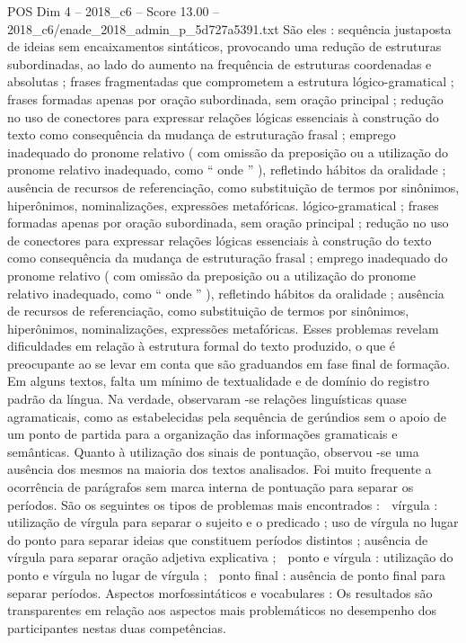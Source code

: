\begin{textsample}{POS Dim 4 – 2018\_c6 – Score 13.00 – 2018\_c6/enade\_2018\_admin\_p\_5d727a5391.txt}
São eles : sequência justaposta de ideias sem encaixamentos sintáticos, provocando uma redução de estruturas subordinadas, ao lado do aumento na frequência de estruturas coordenadas e absolutas ; frases fragmentadas que comprometem a estrutura lógico-gramatical ; frases formadas apenas por oração subordinada, sem oração principal ; redução no uso de conectores para expressar relações lógicas essenciais à construção do texto como consequência da mudança de estruturação frasal ; emprego inadequado do pronome relativo ( com omissão da preposição ou a utilização do pronome relativo inadequado, como “ onde ” ), refletindo hábitos da oralidade ; ausência de recursos de referenciação, como substituição de termos por sinônimos, hiperônimos, nominalizações, expressões metafóricas. lógico-gramatical ; frases formadas apenas por oração subordinada, sem oração principal ; redução no uso de conectores para expressar relações lógicas essenciais à construção do texto como consequência da mudança de estruturação frasal ; emprego inadequado do pronome relativo ( com omissão da preposição ou a utilização do pronome relativo inadequado, como “ onde ” ), refletindo hábitos da oralidade ; ausência de recursos de referenciação, como substituição de termos por sinônimos, hiperônimos, nominalizações, expressões metafóricas.
Esses problemas revelam dificuldades em relação à estrutura formal do texto produzido, o que é preocupante ao se levar em conta que são graduandos em fase final de formação.
Em alguns textos, falta um mínimo de textualidade e de domínio do registro padrão da língua.
Na verdade, observaram -se relações linguísticas quase agramaticais, como as estabelecidas pela sequência de gerúndios sem o apoio de um ponto de partida para a organização das informações gramaticais e semânticas.
Quanto à utilização dos sinais de pontuação, observou -se uma ausência dos mesmos na maioria dos textos analisados.
Foi muito frequente a ocorrência de parágrafos sem marca interna de pontuação para separar os períodos.
São os seguintes os tipos de problemas mais encontrados :  vírgula : utilização de vírgula para separar o sujeito e o predicado ; uso de vírgula no lugar do ponto para separar ideias que constituem períodos distintos ; ausência de vírgula para separar oração adjetiva explicativa ;  ponto e vírgula : utilização do ponto e vírgula no lugar de vírgula ;  ponto final : ausência de ponto final para separar períodos.
Aspectos morfossintáticos e vocabulares : Os resultados são transparentes em relação aos aspectos mais problemáticos no desempenho dos participantes nestas duas competências.

\end{textsample}
